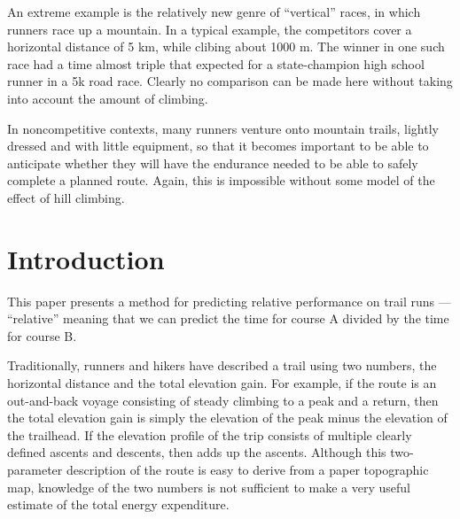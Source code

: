 \documentclass[10pt,letterpaper]{article}
\begin{document}
An extreme example is the relatively new genre
of ``vertical'' races, in which runners race up a mountain.
In a typical example, the competitors cover a horizontal distance of 5 km,
while clibing about 1000 m. The winner in one such race had a time
almost triple that expected for a state-champion high school runner in
a 5k road race. Clearly no comparison can be made here without taking into account
the amount of climbing.

In noncompetitive contexts, many runners venture onto mountain trails,
lightly dressed and with little equipment, so that it becomes important to be able
to anticipate whether they will have the endurance needed to be able to safely complete a planned route.
Again, this is impossible without some model of the effect of hill climbing.



\section{Introduction}

This paper presents a method for predicting relative performance on trail runs --- ``relative''
meaning that we can predict the time for course A divided by the time for course B.

Traditionally, runners and hikers have described a trail using two numbers, the horizontal distance and the total elevation gain.
For example, if the route is an out-and-back voyage consisting of steady climbing to a peak and
a return, then the total elevation gain is simply the elevation of the peak minus the elevation of
the trailhead. If the elevation profile of the trip consists of multiple clearly defined ascents and descents,
then adds up the ascents. Although this two-parameter description of the route is
easy to derive from a paper topographic map, knowledge of the two numbers is not sufficient
to make a very useful estimate of the total energy expenditure.
\end{document}
